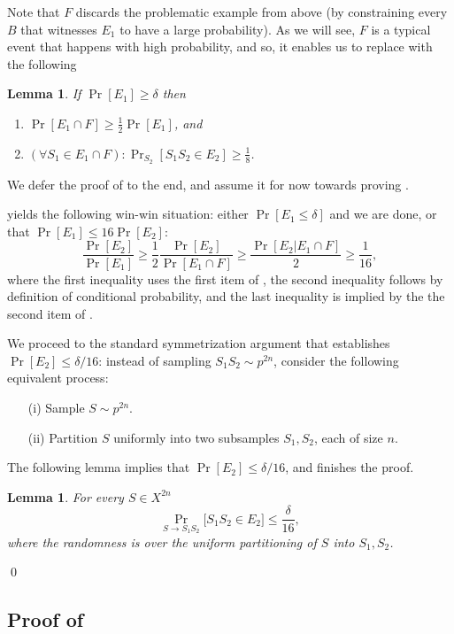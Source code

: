 \documentclass{article}
\newtheorem{lemma}[theorem]{Lemma}
\begin{document}
Note that $F$ discards the problematic example from above 
(by constraining every $B$ that witnesses $E_1$ to have a large probability). 
As we will see, $F$ is a typical event that happens with high probability,
and so, it enables us to replace  with the following
\begin{lemma}\label{lem:reduction}
If $\Pr[E_1]\geq \delta$ then 
\begin{enumerate}
\item $\Pr[E_1\cap F] \geq \frac{1}{2}\Pr[E_1]$, and
\item $(\forall S_1\in E_1\cap F): \Pr_{S_2}[S_1S_2\in E_2] \geq \frac{1}{8}$. 
\end{enumerate}
\end{lemma}
We defer the proof of  to the end, 
and assume it for now towards proving .

 yields the following win-win situation:
either $\Pr[E_1 \leq \delta]$ and we are done, 
or that $\Pr[E_1]\leq 16\Pr[E_2]$:
\[\frac{\Pr[E_2]}{\Pr[E_1]} \geq  \frac{1}{2}\frac{\Pr[E_2]}{\Pr[E_1\cap F]} \geq \frac{\Pr[E_2 \vert E_1\cap F]}{2} \geq \frac{1}{16},\]
where the first inequality uses the first item of , 
the second inequality follows by definition of conditional probability,
and the last inequality is implied by the the second item of .


We proceed to the standard symmetrization argument
that establishes $\Pr[E_2]\leq\delta/16$:
instead of sampling $S_1S_2\sim p^{2n}$,
consider the following equivalent process:
\begin{itemize}
\item[(i)] Sample $S\sim p^{2n}$.
\item[(ii)] Partition $S$ uniformly into two subsamples $S_1,S_2$, each of size $n$.
\end{itemize}
The following lemma implies that $\Pr[E_2]\leq \delta/16$, and finishes the proof.
\begin{lemma}\label{lem:e2}
For every $S\in X^{2n}$
\[\Pr_{S\to S_1S_2}\bigl[S_1S_2\in E_2\bigr]\leq \frac{\delta}{16},\]
where the randomness is over the uniform partitioning
of $S$ into $S_1,S_2$.
\end{lemma}
\qed

\subsection{Proof of }
\end{document}
